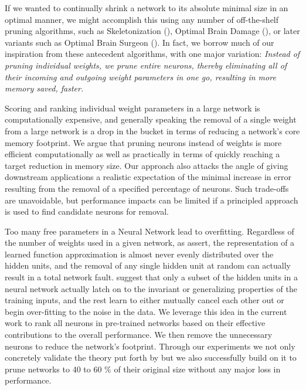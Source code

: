 If we wanted to continually shrink a network to its absolute minimal size in an optimal manner, we might accomplish this using any number of off-the-shelf pruning algorithms, such as Skeletonization (\cite{mozer1989skeletonization}), Optimal Brain Damage (\cite{lecun1989optimal}), or later variants such as Optimal Brain Surgeon (\cite{hassibi1993second}). In fact, we borrow much of our inspiration from these antecedent algorithms, with one major variation:\textit{ Instead of pruning individual weights, we prune entire neurons, thereby eliminating all of their incoming and outgoing weight parameters in one go, resulting in more memory saved, faster.}

Scoring and ranking individual weight parameters in a large network is computationally expensive, and generally speaking the removal of a single weight from a large network is a drop in the bucket in terms of reducing a network's core memory footprint.  We argue that pruning neurons instead of weights is more efficient computationally as well as practically in terms of quickly reaching a target reduction in memory size. Our approach also attacks the angle of giving downstream applications a realistic expectation of the minimal increase in error resulting from the removal of a specified percentage of neurons. Such trade-offs are unavoidable, but performance impacts can be limited if a principled approach is used to find candidate neurons for removal. 

Too many free parameters in a Neural Network lead to overfitting. Regardless of the number of weights used in a given network, as \cite{segee1991fault} assert, the representation of a learned function approximation is almost never evenly distributed over the hidden units, and the removal of any single hidden unit at random can actually result in a total network fault. \cite{mozer1989using} suggest that only a subset of the hidden units in a neural network actually latch on to the invariant or generalizing properties of the training inputs, and the rest learn to either mutually cancel each other out or begin over-fitting to the noise in the data. We leverage this idea in the current work to rank all neurons in pre-trained networks based on their effective contributions to the overall performance. We then remove the unnecessary neurons to reduce the network's footprint. Through our experiments we not only concretely validate the theory put forth by \cite{mozer1989using} but we also successfully build on  it to prune networks to 40 to 60 \% of their original size without any major loss in performance.
